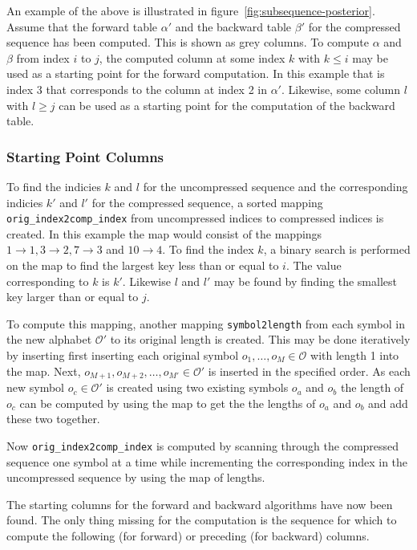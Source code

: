 An example of the above is illustrated in
figure~\ref{fig:subsequence-posterior}. Assume that the forward table $\alpha'$
and the backward table $\beta'$ for the compressed sequence has been computed.
This is shown as grey columns. To compute $\alpha$ and $\beta$ from index $i$
to $j$, the computed column at some index $k$ with $k \le i$ may be used as a
starting point for the forward computation. In this example that is index 3
that corresponds to the column at index 2 in $\alpha'$. Likewise, some column
$l$ with $l \ge j$ can be used as a starting point for the
computation of the backward table.

\subsubsection{Starting Point Columns}

To find the indicies $k$ and $l$ for the uncompressed sequence and the
corresponding indicies $k'$ and $l'$ for the compressed sequence, a sorted
mapping \texttt{orig\_index2comp\_index} from uncompressed indices to
compressed indices is created. In this example the map would consist of the
mappings $1 \rightarrow 1, 3 \rightarrow 2, 7 \rightarrow 3$ and
$10 \rightarrow 4$. To find the index $k$, a binary search is performed on the
map to find the largest key less than or equal to $i$. The value corresponding
to $k$ is $k'$. Likewise $l$ and $l'$ may be found by finding the smallest key
larger than or equal to $j$.

To compute this mapping, another mapping \texttt{symbol2length} from each
symbol in the new alphabet $\mathcal{O'}$ to its original length is
created. This may be done iteratively by inserting first inserting each
original symbol $o_1, \dots, o_M \in \mathcal{O}$ with length 1 into the
map. Next, $o_{M+1}, o_{M+2}, \dots, o_{M'} \in \mathcal{O'}$ is inserted in
the specified order. As each new symbol $o_c \in \mathcal{O'}$ is created using
two existing symbols $o_a$ and $o_b$ the length of $o_c$ can be computed by
using the map to get the the lengths of $o_a$ and $o_b$ and add these two
together.

Now \texttt{orig\_index2comp\_index} is computed by scanning through the
compressed sequence one symbol at a time while incrementing the corresponding
index in the uncompressed sequence by using the map of lengths.

The starting columns for the forward and backward algorithms have now been
found. The only thing missing for the computation is the sequence for which to
compute the following (for forward) or preceding (for backward) columns.

